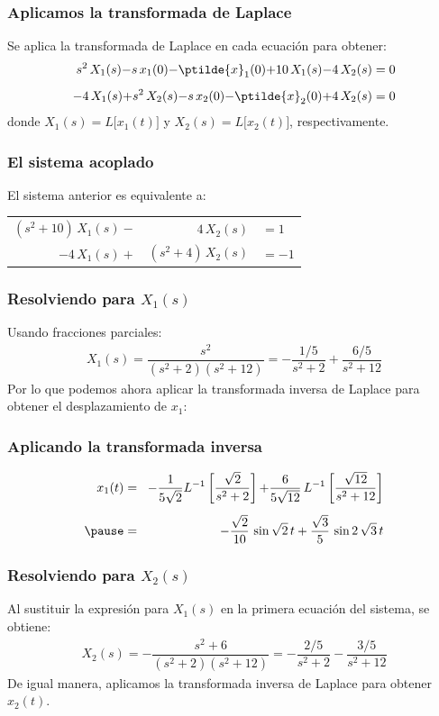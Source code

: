 \begin{frame}
\frametitle{Aplicamos la transformada de Laplace}
Se aplica la transformada de Laplace en cada ecuación para obtener:
\begin{align*}
s^{2} \, X_{1}(s) {-} s \, x_{1}(0) {-} \ptilde{x}_{1}(0) {+} 10 \, X_{1}(s) {-} 4 \, X_{2}(s) = 0 \\[0.5em]
- 4 \, X_{1}(s) {+} s^{2} \, X_{2}(s) {-} s \, x_{2}(0) {-} \ptilde{x}_{2}(0) {+} 4 \, X_{2}(s) = 0
\end{align*}
donde $X_{1}(s) = L \big[x_{1} (t)\big]$ y $X_{2}(s) = L \big[x_{2} (t)\big]$, respectivamente.
\end{frame}
\begin{frame}
\frametitle{El sistema acoplado}
El sistema anterior es equivalente a:
\begin{table}
\begin{tabular}{r r l }
$(s^{2} + 10) \, X_{1}(s)-$ & $4 \, X_{2}(s)$ & $=1$ \\[0.5em]
$-4 \, X_{1}(s)+$ &$(s^{2} + 4) \, X_{2}(s)$ & $=-1$
\end{tabular}
\end{table}
\end{frame}
\begin{frame}
\frametitle{Resolviendo para $X_{1}(s)$}
Usando fracciones parciales:
\begin{align*}
X_{1}(s) = \dfrac{s^{2}}{(s^{2} + 2)(s^{2} + 12)} = - \dfrac{1/5}{s^{2} + 2} + \dfrac{6/5}{s^{2} + 12}
\end{align*}
\pause
Por lo que podemos ahora aplicar la transformada inversa de Laplace para obtener el desplazamiento de $x_{1}$:
\end{frame}
\begin{frame}
\frametitle{Aplicando la transformada inversa}
\begin{eqnarray*}
x_{1}(t) &=& \! -\dfrac{1}{5 \sqrt{2}} L^{-1} \left[ \dfrac{\sqrt{2}}{s^{2} + 2} \right] {+} \dfrac{6}{5 \sqrt{12}} \, L^{-1} \left[ \dfrac{\sqrt{12}}{s^{2} + 12} \right] \\[0.5em] \pause
&=& - \dfrac{\sqrt{2}}{10} \, \sin \sqrt{2} \, t + \dfrac{\sqrt{3}}{5} \, \sin 2 \, \sqrt{3} \, t
\end{eqnarray*}
\end{frame}
\begin{frame}
\frametitle{Resolviendo para $X_{2}(s)$}
Al sustituir la expresión para $X_{1}(s)$ en la primera ecuación del sistema, se obtiene:
\begin{align*}
X_{2}(s) = - \dfrac{s^{2} + 6}{(s^{2} + 2)(s^{2} + 12)} = - \dfrac{2/5}{s^{2} + 2} - \dfrac{3/5}{s^{2} + 12}
\end{align*}
\pause
De igual manera, aplicamos la transformada inversa de Laplace para obtener $x_{2}(t)$.
\end{frame}
